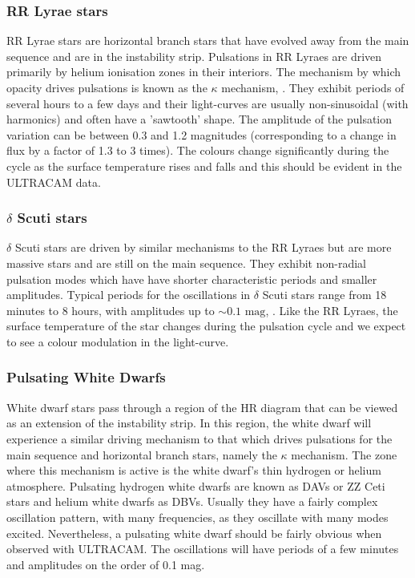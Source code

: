 \subsubsection{RR Lyrae stars}
RR Lyrae stars are horizontal branch stars that have evolved away from the main sequence and are in the instability strip. Pulsations in RR Lyraes are driven primarily by helium ionisation zones in their interiors. The mechanism by which opacity drives pulsations is known as the $\kappa$ mechanism, \citep{asteroseismology}. They exhibit periods of several hours to a few days and their light-curves are usually non-sinusoidal (with harmonics) and often have a 'sawtooth' shape. The amplitude of the pulsation variation can be between 0.3 and 1.2 magnitudes (corresponding to a change in flux by a factor of 1.3 to 3 times). The colours change significantly during the cycle as the surface temperature rises and falls and this should be evident in the ULTRACAM data. 

\subsubsection{$\delta$ Scuti stars}
$\delta$ Scuti stars are driven by similar mechanisms to the RR Lyraes but are more massive stars and are still on the main sequence. They exhibit non-radial pulsation modes which have have shorter characteristic periods and smaller amplitudes. Typical periods for the oscillations in $\delta$ Scuti stars range from 18 minutes to 8 hours, with amplitudes up to $\sim \mbox{0.1 mag}$, \citep{KurtzBook}. Like the RR Lyraes, the surface temperature of the star changes during the pulsation cycle and we expect to see a colour modulation in the light-curve. 

\subsubsection{Pulsating White Dwarfs}
White dwarf stars pass through a region of the HR diagram that can be viewed as an extension of the instability strip. In this region, the white dwarf will experience a similar driving mechanism to that which drives pulsations for the main sequence and horizontal branch stars, namely the $\kappa$ mechanism. The zone where this mechanism is active is the white dwarf's thin hydrogen or helium atmosphere. Pulsating hydrogen white dwarfs are known as {DAVs} or {ZZ Ceti} stars and helium white dwarfs as {DBV}s. Usually they have a fairly complex oscillation pattern, with many frequencies, as they oscillate with many modes excited. Nevertheless, a pulsating white dwarf should be fairly obvious when observed with ULTRACAM. The oscillations will have periods of a few minutes and amplitudes on the order of 0.1 mag. 


